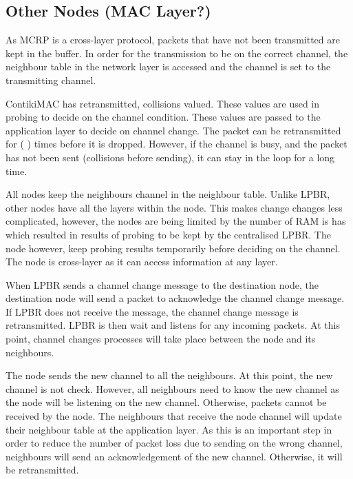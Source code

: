 \subsection{Other Nodes (MAC Layer?)}
As MCRP is a cross-layer protocol, packets that have not been transmitted are kept in the buffer. In order for the transmission to be on the correct channel, the neighbour table in the network layer is accessed and the channel is set to the transmitting channel. 

ContikiMAC has retransmitted, collisions valued. These values are used in probing to decide on the channel condition. These values are passed to the application layer to decide on channel change. The packet can be retransmitted for ( ) times before it is dropped. However, if the channel is busy, and the packet has not been sent (collisions before sending), it can stay in the loop for a long time.

All nodes keep the neighbours channel in the neighbour table. Unlike LPBR, other nodes have all the layers within the node. This makes change changes less complicated, however, the nodes are being limited by the number of RAM is has which resulted in results of probing to be kept by the centralised LPBR. The node however, keep probing results temporarily before deciding on the channel. The node is cross-layer as it can access information at any layer.

When LPBR sends a channel change message to the destination node, the destination node will send a packet to acknowledge the channel change message. If LPBR does not receive the message, the channel change message is retransmitted. LPBR is then wait and listens for any incoming packets. At this point, channel changes processes will take place between the node and its neighbours.

The node sends the new channel to all the neighbours. At this point, the new channel is not check. However, all neighbours need to know the new channel as the node will be listening on the new channel. Otherwise, packets cannot be received by the node. The neighbours that receive the node channel will update their neighbour table at the application layer. As this is an important step in order to reduce the number of packet loss due to sending on the wrong channel, neighbours will send an acknowledgement of the new channel. Otherwise, it will be retransmitted. 


